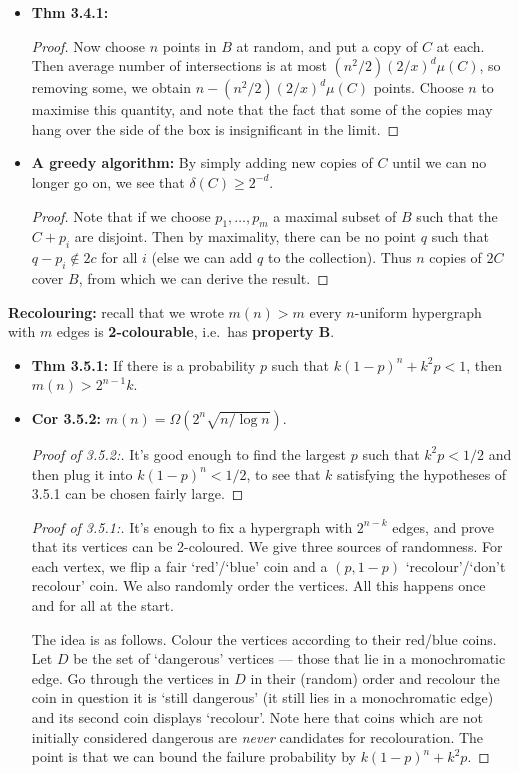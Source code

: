 \documentclass[11pt]{article}
\newenvironment{INT}[1][]{\begin{itemize}\small\item\textbf{#1}}{\end{itemize}}
\newcommand{\moreINT}[1][]{\item\textbf{#1}}
\begin{document}
\begin{chapter3}
\begin{itemise}
\begin{INT}[Thm 3.4.1:]
\begin{proof}
\INDENT Now choose $n$ points in $B$ at random, and put a copy of $C$ at each. Then average number of intersections is at most $(n^2/2)(2/x)^d\mu(C)$, so removing some, we obtain $n-(n^2/2)(2/x)^d\mu(C)$ points. Choose $n$ to maximise this quantity, and note that the fact that some of the copies may hang over the side of the box is insignificant in the limit.
\end{proof}
\moreINT[A greedy algorithm:] By simply adding new copies of $C$ until we can no longer go on, we see that $\delta(C)\geq 2^{-d}$.
\begin{proof}
Note that if we choose $p_1,\ldots,p_m$ a maximal subset of $B$ such that the $C+p_i$ are disjoint. Then by maximality, there can be no point $q$ such that $q-p_i\notin 2c$ for all $i$ (else we can add $q$ to the collection). Thus $n$ copies of $2C$ cover $B$, from which we can derive the result.
\end{proof}
\end{INT}
\item \textbf{Recolouring:}  recall that we wrote $m(n)>m$ \Iff every $n$-uniform hypergraph with $m$ edges is \textbf{2-colourable}, i.e.\ has \textbf{property B}.
\begin{INT}[Thm 3.5.1:]
If there is a probability $p$ such that $k(1-p)^n+k^2p<1$, then $m(n)>2^{n-1}k$.
\moreINT[Cor 3.5.2:] $m(n)=\Omega(2^n\sqrt{n/\log n})$.
\begin{proof}[Proof of 3.5.2:]
It's good enough to find the largest $p$ such that $k^2p<1/2$ and then plug it into $k(1-p)^n<1/2$, to see that $k$ satisfying the hypotheses of 3.5.1 can be chosen fairly large.
\end{proof}
\begin{proof}[Proof of 3.5.1:]
It's enough to fix a hypergraph with $2^{n-k}$ edges, and prove that its vertices can be 2-coloured.
We give three sources of randomness. For each vertex, we flip a fair `red'/`blue' coin and a $(p,1-p)$ `recolour'/`don't recolour' coin. We also randomly order the vertices. All this happens once and for all at the start.

\INDENT The idea is as follows. Colour the vertices according to their red/blue coins. Let $D$ be the set of `dangerous' vertices --- those that lie in a monochromatic edge. Go through the vertices in $D$ in their (random) order and recolour the coin in question \Iff it is `still dangerous' (it still lies in a monochromatic edge) and its second coin displays `recolour'. Note here that coins which are not initially considered dangerous are \emph{never} candidates for recolouration. The point is that we can bound the failure probability by $k(1-p)^n+k^2p$.


\end{proof}
\end{INT}
\end{itemise}
\end{chapter3}
\end{document}
